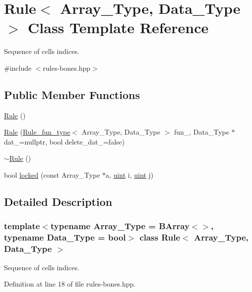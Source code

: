 \hypertarget{class_rule}{}\section{Rule$<$ Array\+\_\+\+Type, Data\+\_\+\+Type $>$ Class Template Reference}
\label{class_rule}


Sequence of cells indices.  




{\ttfamily \#include $<$rules-\/bones.\+hpp$>$}

\subsection*{Public Member Functions}
\begin{DoxyCompactItemize}
\item 
\hyperlink{class_rule_aef92e54d53dc77b5cad2f819b5f8f4bf}{Rule} ()
\item 
\hyperlink{class_rule_ad0b81db664bed03f9a381f90ab617424}{Rule} (\hyperlink{typedefs_8hpp_a2e147c9c0e8b65be614c98a5dd400d5c}{Rule\+\_\+fun\+\_\+type}$<$ Array\+\_\+\+Type, Data\+\_\+\+Type $>$ fun\+\_\+, Data\+\_\+\+Type $\ast$dat\+\_\+=nullptr, bool delete\+\_\+dat\+\_\+=false)
\item 
\hyperlink{class_rule_a9f7e4ac4893005c7d4ecc2781f0f727d}{$\sim$\+Rule} ()
\item 
bool \hyperlink{class_rule_a0a9a115c6951a5c8de699d4ff9f69060}{locked} (const Array\+\_\+\+Type $\ast$a, \hyperlink{typedefs_8hpp_a91ad9478d81a7aaf2593e8d9c3d06a14}{uint} i, \hyperlink{typedefs_8hpp_a91ad9478d81a7aaf2593e8d9c3d06a14}{uint} j)
\end{DoxyCompactItemize}


\subsection{Detailed Description}
\subsubsection*{template$<$typename Array\+\_\+\+Type = B\+Array$<$$>$, typename Data\+\_\+\+Type = bool$>$\newline
class Rule$<$ Array\+\_\+\+Type, Data\+\_\+\+Type $>$}

Sequence of cells indices. 



Definition at line 18 of file rules-\/bones.\+hpp.



